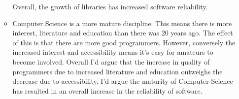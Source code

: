 \documentclass[10pt,\jkfside,a4paper]{article}
\begin{document}
\begin{enumerate}
\begin{itemize}
Overall, the growth of libraries has increased software reliability.

\item Computer Science is a more mature discipline. This means there is more
interest, literature and education than there was 20 years ago. The effect
of this is that there are more good programmers. However, conversely the
increased interest and accessibility means it's easy for amateurs to
become involved. Overall I'd argue that the increase in quality of
programmers due to increased literature and education outweighs the
decrease due to accessibility. I'd argue the maturity of Computer
Science has resulted in an overall increase in the reliability of software.

\end{itemize}

\end{enumerate}
\end{document}
